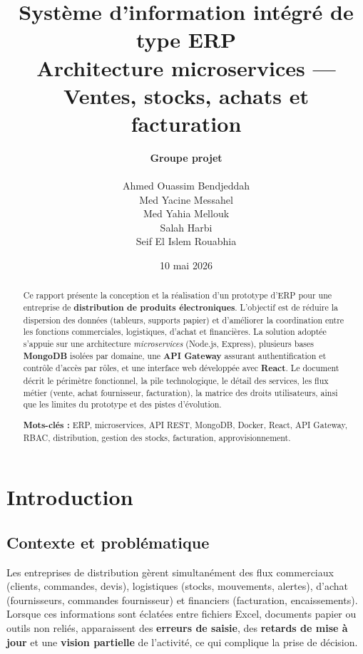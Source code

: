 \documentclass[11pt,a4paper]{article}
\title{\textbf{Système d'information intégré de type ERP}\\[0.35em]
\large Architecture microservices — Ventes, stocks, achats et facturation}
\author{%
\textbf{Groupe projet}\\[0.75em]
\begin{tabular}{c}
Ahmed Ouassim Bendjeddah \\
Med Yacine Messahel \\
Med Yahia Mellouk \\
Salah Harbi \\
Seif El Islem Rouabhia
\end{tabular}
}
\date{10 mai 2026}
\begin{document}
\maketitle

\begin{abstract}
\noindent
Ce rapport présente la conception et la réalisation d'un prototype d'ERP pour une entreprise de \textbf{distribution de produits électroniques}. L'objectif est de réduire la dispersion des données (tableurs, supports papier) et d'améliorer la coordination entre les fonctions commerciales, logistiques, d'achat et financières. La solution adoptée s'appuie sur une architecture \emph{microservices} (Node.js, Express), plusieurs bases \textbf{MongoDB} isolées par domaine, une \textbf{API Gateway} assurant authentification et contrôle d'accès par rôles, et une interface web développée avec \textbf{React}. Le document décrit le périmètre fonctionnel, la pile technologique, le détail des services, les flux métier (vente, achat fournisseur, facturation), la matrice des droits utilisateurs, ainsi que les limites du prototype et des pistes d'évolution.

\vspace{0.75em}
\noindent\textbf{Mots-clés :}
ERP, microservices, API REST, MongoDB, Docker, React, API Gateway, RBAC, distribution, gestion des stocks, facturation, approvisionnement.
\end{abstract}

\tableofcontents
\newpage

\section{Introduction}

\subsection{Contexte et problématique}
Les entreprises de distribution gèrent simultanément des flux commerciaux (clients, commandes, devis), logistiques (stocks, mouvements, alertes), d'achat (fournisseurs, commandes fournisseur) et financiers (facturation, encaissements). Lorsque ces informations sont éclatées entre fichiers Excel, documents papier ou outils non reliés, apparaissent des \textbf{erreurs de saisie}, des \textbf{retards de mise à jour} et une \textbf{vision partielle} de l'activité, ce qui complique la prise de décision.
\end{document}
